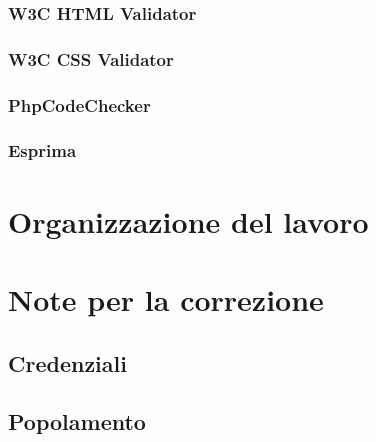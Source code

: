 \documentclass[a4paper]{article}
\begin{document}
			\subsubsection{W3C HTML Validator}
				
			\subsubsection{W3C CSS Validator}
				
			\subsubsection{PhpCodeChecker}
				
			\subsubsection{Esprima}
				
				
	\newpage

	\section{Organizzazione del lavoro}
		
	
	\newpage
	
	\appendix
	\section{Note per la correzione}
		
		\subsection{Credenziali}
			
		\subsection{Popolamento}
			
    
\end{document}
